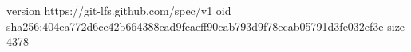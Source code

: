 version https://git-lfs.github.com/spec/v1
oid sha256:404ea772d6ce42b664388cad9fcaeff90cab793d9f78ecab05791d3fe032ef3e
size 4378
